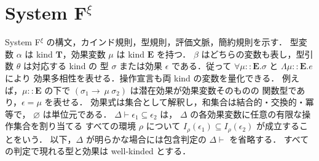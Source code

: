 \section{\texorpdfstring{System F$^{\xi}$}{System Fξ}}

System F$^{\xi}$ の構文，カインド規則，型規則，評価文脈，簡約規則を示す．
型変数 $\alpha$ は kind $\mathbf{T}$，効果変数 $\mu$ は kind $\mathbf{E}$ を持つ．
$\beta$ はどちらの変数も表し，型引数 $\theta$ は対応する kind の
型 $\sigma$ または効果 $\epsilon$ である．従って
$\forall\mu::\mathbf{E}.\sigma$ と $\Lambda\mu::\mathbf{E}.e$ により
効果多相性を表せる．操作宣言も両 kind の変数を量化できる．
例えば，$\mu::\mathbf{E}$ の下で
$(\sigma_1\rightarrow~\mu~\sigma_2)$ は潜在効果が効果変数そのものの
関数型であり，$\epsilon=\mu$ を表せる．
効果式は集合として解釈し，和集合は結合的・交換的・冪等で，
$\varnothing$ は単位元である．
$\Delta\vdash\epsilon_1\subseteq\epsilon_2$ は，
$\Delta$ の各効果変数に任意の有限な操作集合を割り当てる
すべての環境 $\rho$ について
$I_\rho(\epsilon_1)\subseteq I_\rho(\epsilon_2)$
が成立することをいう．
以下，$\Delta$ が明らかな場合には包含判定の $\Delta\vdash$ を省略する．
すべての判定で現れる型と効果は well-kinded とする．






\clearpage


